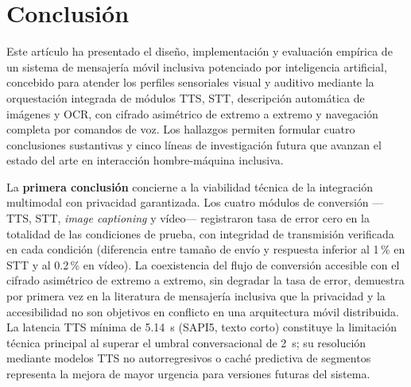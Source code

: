 \documentclass[journal]{IEEEtran}
\begin{document}
	\section{Conclusi\'on}
	\label{sec:conclusion}
	Este art\'iculo ha presentado el dise\~no, implementaci\'on y evaluaci\'on emp\'irica de un sistema de mensajer\'ia m\'ovil inclusiva potenciado por inteligencia artificial, concebido para atender los perfiles sensoriales visual y auditivo mediante la orquestaci\'on integrada de m\'odulos TTS, STT, descripci\'on autom\'atica de im\'agenes y OCR, con cifrado asim\'etrico de extremo a extremo y navegaci\'on completa por comandos de voz. Los hallazgos permiten formular cuatro conclusiones sustantivas y cinco l\'ineas de investigaci\'on futura que avanzan el estado del arte en interacci\'on hombre-m\'aquina inclusiva.
	
	La \textbf{primera conclusi\'on} concierne a la viabilidad t\'ecnica de la integraci\'on multimodal con privacidad garantizada. Los cuatro m\'odulos de conversi\'on ---TTS, STT, \textit{image captioning} y v\'ideo--- registraron tasa de error cero en la totalidad de las condiciones de prueba, con integridad de transmisi\'on verificada en cada condici\'on (diferencia entre tama\~no de env\'io y respuesta inferior al 1\,\% en STT y al 0.2\,\% en v\'ideo). La coexistencia del flujo de conversi\'on accesible con el cifrado asim\'etrico de extremo a extremo, sin degradar la tasa de error, demuestra por primera vez en la literatura de mensajer\'ia inclusiva que la privacidad y la accesibilidad no son objetivos en conflicto en una arquitectura m\'ovil distribuida. La latencia TTS m\'inima de 5.14~s (SAPI5, texto corto) constituye la limitaci\'on t\'ecnica principal al superar el umbral conversacional de 2~s; su resoluci\'on mediante modelos TTS no autorregresivos o cach\'e predictiva de segmentos representa la mejora de mayor urgencia para versiones futuras del sistema.
	
\end{document}

